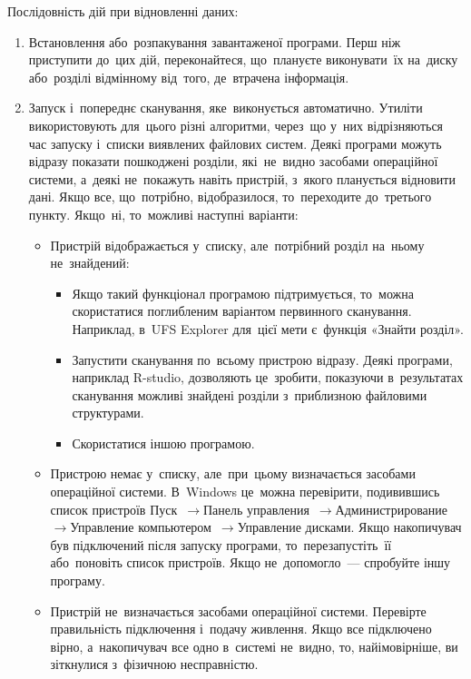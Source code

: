 \documentclass[
	a4paper,
	oneside,
	DIV = 12,
	fontsize = 13pt,
	headings = normal,
]{scrartcl}
\newcommand{\allcaps}[1]{{\addfontfeatures{LetterSpace = 5}#1}}
\newcommand{\Mytextrightarrow}{$\rightarrow$\hspace{0.25em}}
\begin{document}
		Послідовність дій при відновленні даних:
		\begin{enumerate}
			\item Встановлення або~розпакування завантаженої програми. Перш ніж приступити до~цих дій, переконайтеся, що~плануєте виконувати~їх на~диску або~розділі відмінному від~того, де~втрачена інформація. 

			\item Запуск і~попереднє сканування, яке~виконується автоматично. Утиліти використовують для~цього різні алгоритми, через~що у~них відрізняються час запуску і~списки виявлених файлових систем. Деякі програми можуть відразу показати пошкоджені розділи, які~не~видно засобами операційної системи, а~деякі не~покажуть навіть пристрій, з~якого планується відновити дані. Якщо все, що~потрібно, відобразилося, то~переходите до~третього пункту. Якщо~ні, то~можливі наступні варіанти: 
				\begin{itemize}
					\item	Пристрій відображається у~списку, але~потрібний розділ на~ньому не~знайдений: 
						\begin{itemize}
							\item Якщо такий функціонал програмою підтримується, то~можна скористатися поглибленим варіантом первинного сканування. Наприклад, в~\textenglish{\allcaps{UFS} Explorer} для~цієї мети є~функція «Знайти розділ». 

							\item Запустити сканування по~всьому пристрою відразу. Деякі програми, наприклад \textenglish{R-studio}, дозволяють це~зробити, показуючи в~результатах сканування можливі знайдені розділи з~приблизною файловими структурами. 

							\item Скористатися іншою програмою. 
						\end{itemize}

					\item	Пристрою немає у~списку, але~при~цьому визначається засобами операційної системи. В~\textenglish{Windows} це~можна перевірити, подивившись список пристроїв \textrussian{Пуск~\Mytextrightarrow Панель управления~\Mytextrightarrow Администрирование~\Mytextrightarrow Управление компьютером~\Mytextrightarrow Управление дисками}. Якщо накопичувач був підключений після запуску програми, то~перезапустіть~її або~поновіть список пристроїв. Якщо не~допомогло~— спробуйте іншу програму. 

					\item	Пристрій не~визначається засобами операційної системи. Перевірте правильність підключення і~подачу живлення. Якщо все підключено вірно, а~накопичувач все одно в~системі не~видно, то, найімовірніше, ви зіткнулися з~фізичною несправністю.
				\end{itemize}


\end{enumerate}
\end{document}
